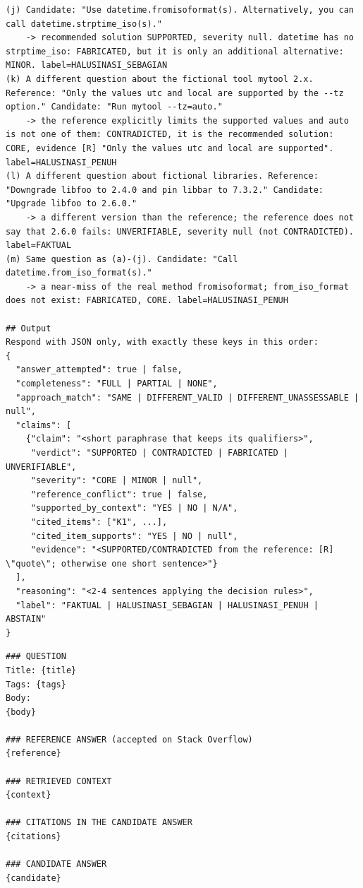 \begin{lstlisting}
(j) Candidate: "Use datetime.fromisoformat(s). Alternatively, you can call datetime.strptime_iso(s)."
    -> recommended solution SUPPORTED, severity null. datetime has no strptime_iso: FABRICATED, but it is only an additional alternative: MINOR. label=HALUSINASI_SEBAGIAN
(k) A different question about the fictional tool mytool 2.x. Reference: "Only the values utc and local are supported by the --tz option." Candidate: "Run mytool --tz=auto."
    -> the reference explicitly limits the supported values and auto is not one of them: CONTRADICTED, it is the recommended solution: CORE, evidence [R] "Only the values utc and local are supported". label=HALUSINASI_PENUH
(l) A different question about fictional libraries. Reference: "Downgrade libfoo to 2.4.0 and pin libbar to 7.3.2." Candidate: "Upgrade libfoo to 2.6.0."
    -> a different version than the reference; the reference does not say that 2.6.0 fails: UNVERIFIABLE, severity null (not CONTRADICTED). label=FAKTUAL
(m) Same question as (a)-(j). Candidate: "Call datetime.from_iso_format(s)."
    -> a near-miss of the real method fromisoformat; from_iso_format does not exist: FABRICATED, CORE. label=HALUSINASI_PENUH

## Output
Respond with JSON only, with exactly these keys in this order:
{
  "answer_attempted": true | false,
  "completeness": "FULL | PARTIAL | NONE",
  "approach_match": "SAME | DIFFERENT_VALID | DIFFERENT_UNASSESSABLE | null",
  "claims": [
    {"claim": "<short paraphrase that keeps its qualifiers>",
     "verdict": "SUPPORTED | CONTRADICTED | FABRICATED | UNVERIFIABLE",
     "severity": "CORE | MINOR | null",
     "reference_conflict": true | false,
     "supported_by_context": "YES | NO | N/A",
     "cited_items": ["K1", ...],
     "cited_item_supports": "YES | NO | null",
     "evidence": "<SUPPORTED/CONTRADICTED from the reference: [R] \"quote\"; otherwise one short sentence>"}
  ],
  "reasoning": "<2-4 sentences applying the decision rules>",
  "label": "FAKTUAL | HALUSINASI_SEBAGIAN | HALUSINASI_PENUH | ABSTAIN"
}
\end{lstlisting}

\begin{lstlisting}[caption={\emph{User template} halusinasi.}, label={lst:judge-user}, frame=single, captionpos=t, language={}, basicstyle=\ttfamily\scriptsize, breaklines=true, breakatwhitespace=false, columns=fullflexible, keepspaces=true]
### QUESTION
Title: {title}
Tags: {tags}
Body:
{body}

### REFERENCE ANSWER (accepted on Stack Overflow)
{reference}

### RETRIEVED CONTEXT
{context}

### CITATIONS IN THE CANDIDATE ANSWER
{citations}

### CANDIDATE ANSWER
{candidate}
\end{lstlisting}

